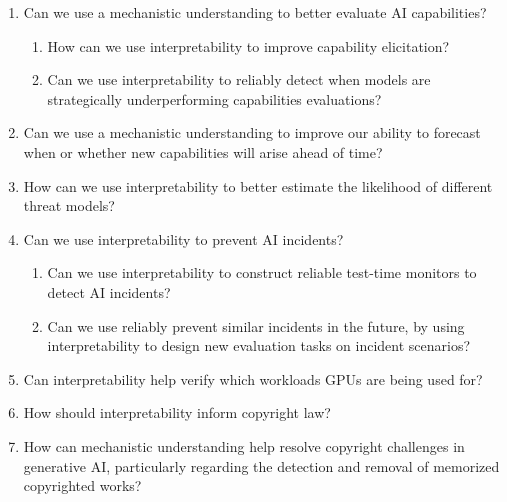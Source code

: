 \begin{enumerate}
    \item Can we use a mechanistic understanding to better evaluate AI capabilities?
    \begin{enumerate}[label=\alph*.]
        \item How can we use interpretability to improve capability elicitation?
        \item Can we use interpretability to reliably detect when models are strategically underperforming capabilities evaluations?
    \end{enumerate}
    
    \item Can we use a mechanistic understanding to improve our ability to forecast when or whether new capabilities will arise ahead of time?

    
    \item How can we use interpretability to better estimate the likelihood of different threat models?


    \item Can we use interpretability to prevent AI incidents?
    \begin{enumerate}[label=\alph*.]
        \item Can we use interpretability to construct reliable test-time monitors to detect AI incidents?
        \item Can we use reliably prevent similar incidents in the future, by using interpretability to design new evaluation tasks on incident scenarios?
    \end{enumerate}
    \item Can interpretability help verify which workloads GPUs are being used for?
    \item How should interpretability inform copyright law?
    \item How can mechanistic understanding help resolve copyright challenges in generative AI, particularly regarding the detection and removal of memorized copyrighted works?
\end{enumerate}


